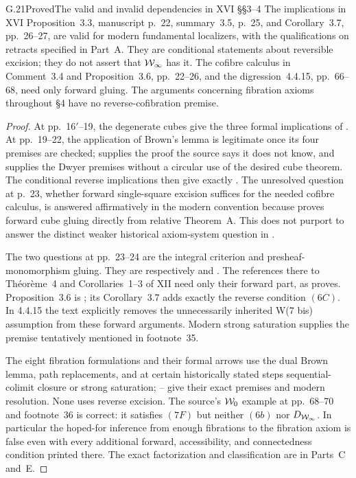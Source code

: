 \begin{claim}{G.21}{Proved}{The valid and invalid dependencies in XVI \S\S3--4}
The implications in XVI Proposition~3.3, manuscript p.~22, summary~3.5, p.~25, and Corollary~3.7, pp.~26--27, are valid for modern fundamental localizers, with the qualifications on retracts specified in Part~A. They are conditional statements about reversible excision; they do not assert that $\mathcal{W}_{\infty}$ has it. The cofibre calculus in Comment~3.4 and Proposition~3.6, pp.~22--26, and the digression~4.4.15, pp.~66--68, need only forward gluing. The arguments concerning fibration axioms throughout \S4 have no reverse-cofibration premise.
\end{claim}
\begin{proof}
At pp.~16$'$--19, the degenerate cubes give the three formal implications of . At pp.~19--22, the application of Brown's lemma is legitimate once its four premises are checked;  supplies the proof the source says it does not know, and  supplies the Dwyer premises without a circular use of the desired cube theorem. The conditional reverse implications then give exactly . The unresolved question at p.~23, whether forward single-square excision suffices for the needed cofibre calculus, is answered affirmatively in the modern convention because  proves forward cube gluing directly from relative Theorem~A. This does not purport to answer the distinct weaker historical axiom-system question in .

The two questions at pp.~23--24 are the integral criterion and presheaf-monomorphism gluing. They are respectively  and . The references there to Th\'eor\`eme~4 and Corollaries~1--3 of XII need only their forward part, as  proves. Proposition~3.6 is ; its Corollary~3.7 adds exactly the reverse condition $(6C)$. In 4.4.15 the text explicitly removes the unnecessarily inherited W(7 bis) assumption from these forward arguments. Modern strong saturation supplies the premise tentatively mentioned in footnote~35.

The eight fibration formulations and their formal arrows use the dual Brown lemma, path replacements, and at certain historically stated steps sequential-colimit closure or strong saturation; -- give their exact premises and modern resolution. None uses reverse excision. The source's $\mathcal{W}_0$ example at pp.~68--70 and footnote~36 is correct: it satisfies $(7F)$ but neither $(6b)$ nor $D_{\mathcal{W}_{\infty}}$. In particular the hoped-for inference from enough fibrations to the fibration axiom is false even with every additional forward, accessibility, and connectedness condition printed there. The exact factorization and classification are in Parts~C and~E.
\end{proof}

